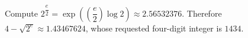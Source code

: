 Compute $2^{\dfrac{e}{2}}=\exp((\dfrac{e}{2})\log 2)\approx 2.56532376$. Therefore $4-\sqrt{2^e}\approx 1.43467624$, whose requested four-digit integer is $\boxed{1434}$.
